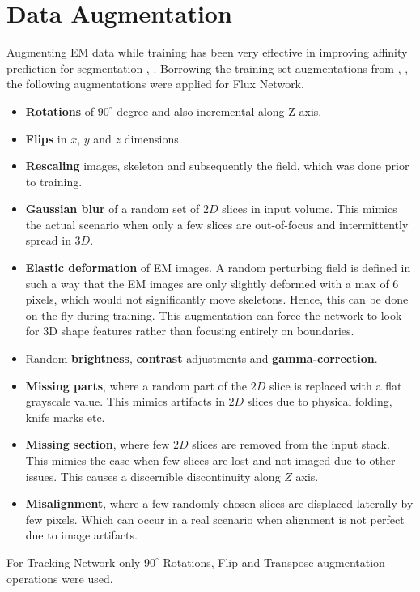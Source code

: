 \section{Data Augmentation}
Augmenting EM data while training has been very effective in improving affinity prediction for segmentation \cite{Zeng2017}, \cite{Kisuk2017}.
Borrowing the training set augmentations from \cite{Kisuk2017}, \cite{ELEKTRONN}, the following augmentations were applied for Flux Network.
\begin{itemize}
	\item \textbf{Rotations} of $90^{\circ}$ degree and also incremental along Z axis.
	\item \textbf{Flips} in $x$, $y$ and $z$ dimensions.
	\item \textbf{Rescaling} images, skeleton and subsequently the field, which was done prior to training.
	\item \textbf{Gaussian blur} of a random set of $2D$ slices in input volume. This mimics the actual scenario when only a few slices are out-of-focus and intermittently spread in $3D$.
	\item \textbf{Elastic deformation} of EM images. A random perturbing field is defined in such a way that the EM images are only slightly deformed with a max of 6 pixels, which would not significantly move skeletons. Hence, this can be done on-the-fly during training. This augmentation can force the network to look for 3D shape features rather than focusing entirely on boundaries.
	\item Random \textbf{brightness}, \textbf{contrast} adjustments and \textbf{gamma-correction}.
	\item \textbf{Missing parts}, where a random part of the $2D$ slice is replaced with a flat grayscale value. This mimics artifacts in $2D$ slices due to physical folding, knife marks etc.
	\item \textbf{Missing section}, where few $2D$ slices are removed from the input stack. This mimics the case when few slices are lost and not imaged due to other issues. This causes a discernible discontinuity along $Z$ axis.
	\item \textbf{Misalignment}, where a few randomly chosen slices are displaced laterally by few pixels. Which can occur in a real scenario when alignment is not perfect due to image artifacts. 
\end{itemize}

For Tracking Network only $90^{\circ}$ Rotations, Flip and Transpose augmentation operations were used.